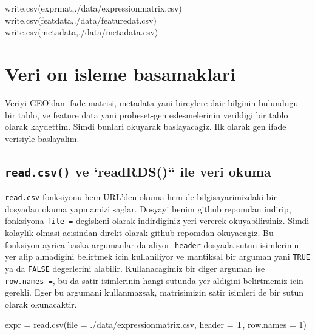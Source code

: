 \documentclass[
]{book}
\newenvironment{Shaded}{\begin{snugshade}}{\end{snugshade}}
\newcommand{\AttributeTok}[1]{\textcolor[rgb]{0.77,0.63,0.00}{#1}}
\newcommand{\DecValTok}[1]{\textcolor[rgb]{0.00,0.00,0.81}{#1}}
\newcommand{\FunctionTok}[1]{\textcolor[rgb]{0.00,0.00,0.00}{#1}}
\newcommand{\NormalTok}[1]{#1}
\newcommand{\OtherTok}[1]{\textcolor[rgb]{0.56,0.35,0.01}{#1}}
\newcommand{\StringTok}[1]{\textcolor[rgb]{0.31,0.60,0.02}{#1}}
\begin{document}
\begin{Shaded}
\begin{Highlighting}[]
\FunctionTok{write.csv}\NormalTok{(exprmat,}\StringTok{\textquotesingle{}./data/expressionmatrix.csv\textquotesingle{}}\NormalTok{)}
\FunctionTok{write.csv}\NormalTok{(featdata,}\StringTok{\textquotesingle{}./data/featuredat.csv\textquotesingle{}}\NormalTok{)}
\FunctionTok{write.csv}\NormalTok{(metadata,}\StringTok{\textquotesingle{}./data/metadata.csv\textquotesingle{}}\NormalTok{)}
\end{Highlighting}
\end{Shaded}

\hypertarget{veri-on-isleme-basamaklari}{%
\chapter{Veri on isleme basamaklari}\label{veri-on-isleme-basamaklari}}

Veriyi GEO'dan ifade matrisi, metadata yani bireylere dair bilginin bulundugu bir tablo, ve feature data yani probeset-gen eslesmelerinin verildigi bir tablo olarak kaydettim. Simdi bunlari okuyarak baslayacagiz. Ilk olarak gen ifade verisiyle baslayalim.

\hypertarget{read.csv-ve-readrds-ile-veri-okuma}{%
\section{\texorpdfstring{\texttt{read.csv()} ve `readRDS()`` ile veri okuma}{read.csv() ve `readRDS()`` ile veri okuma}}\label{read.csv-ve-readrds-ile-veri-okuma}}

\texttt{read.csv} fonksiyonu hem URL'den okuma hem de bilgisayarimizdaki bir dosyadan okuma yapmamizi saglar. Dosyayi benim github repomdan indirip, fonksiyona \texttt{file\ =} degiskeni olarak indirdiginiz yeri vererek okuyabilirsiniz. Simdi kolaylik olmasi acisindan direkt olarak github repomdan okuyacagiz. Bu fonksiyon ayrica baska argumanlar da aliyor. \texttt{header} dosyada sutun isimlerinin yer alip almadigini belirtmek icin kullaniliyor ve mantiksal bir arguman yani \texttt{TRUE} ya da \texttt{FALSE} degerlerini alabilir. Kullanacagimiz bir diger arguman ise \texttt{row.names\ =}, bu da satir isimlerinin hangi sutunda yer aldigini belirtmemiz icin gerekli. Eger bu argumani kullanmazsak, matrisimizin satir isimleri de bir sutun olarak okunacaktir.

\begin{Shaded}
\begin{Highlighting}[]
\NormalTok{expr }\OtherTok{=} \FunctionTok{read.csv}\NormalTok{(}\AttributeTok{file =} \StringTok{\textquotesingle{}./data/expressionmatrix.csv\textquotesingle{}}\NormalTok{, }\AttributeTok{header =}\NormalTok{ T, }
                \AttributeTok{row.names =} \DecValTok{1}\NormalTok{)}
\end{Highlighting}
\end{Shaded}
\end{document}
